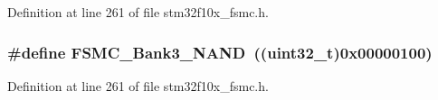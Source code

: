 Definition at line 261 of file stm32f10x\+\_\+fsmc.\+h.

\subsubsection[{\texorpdfstring{F\+S\+M\+C\+\_\+\+Bank3\+\_\+\+N\+A\+ND}{FSMC_Bank3_NAND}}]{\setlength{\rightskip}{0pt plus 5cm}\#define F\+S\+M\+C\+\_\+\+Bank3\+\_\+\+N\+A\+ND~(({\bf uint32\+\_\+t})0x00000100)}\hypertarget{group___f_s_m_c___n_a_n_d___bank_gaf72def0732c026b0245d721ee371c85b}{}\label{group___f_s_m_c___n_a_n_d___bank_gaf72def0732c026b0245d721ee371c85b}


Definition at line 261 of file stm32f10x\+\_\+fsmc.\+h.

